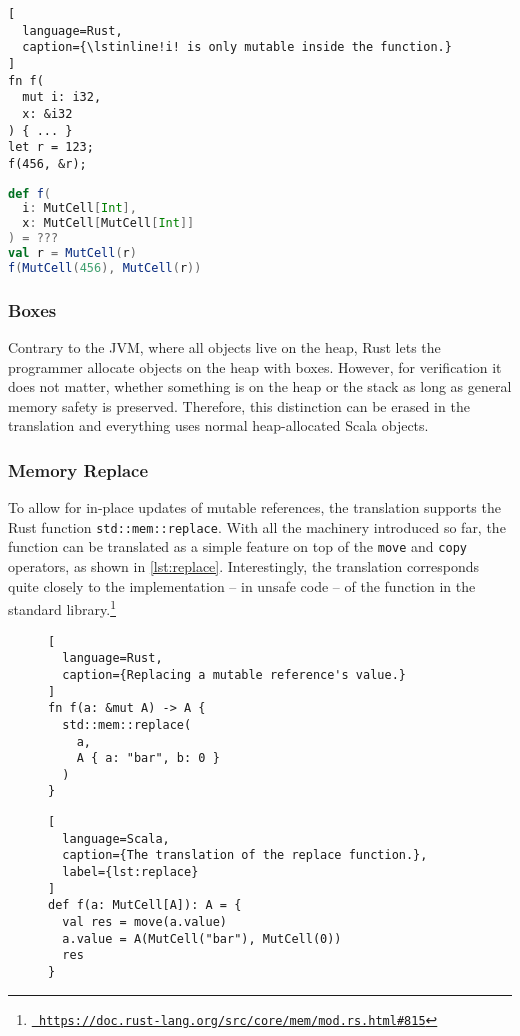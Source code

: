 \noindent\begin{minipage}[t]{.45\textwidth}
\begin{lstlisting}[
  language=Rust,
  caption={\lstinline!i! is only mutable inside the function.}
]
fn f(
  mut i: i32,
  x: &i32
) { ... }
let r = 123;
f(456, &r);
\end{lstlisting}
\end{minipage}\hfill
\begin{minipage}[t]{.45\textwidth}
\begin{lstlisting}[language=Scala]
def f(
  i: MutCell[Int],
  x: MutCell[MutCell[Int]]
) = ???
val r = MutCell(r)
f(MutCell(456), MutCell(r))
\end{lstlisting}
\end{minipage}

\subsubsection{Boxes}

Contrary to the JVM, where all objects live on the heap, Rust lets the
programmer allocate objects on the heap with boxes. However, for verification it
does not matter, whether something is on the heap or the stack as long as
general memory safety is preserved. Therefore, this distinction can be erased in
the translation and everything uses normal heap-allocated Scala objects.

\subsubsection{Memory Replace}

To allow for in-place updates of mutable references, the translation supports
the  Rust function \lstinline!std::mem::replace!. With all the machinery
introduced so far, the function can be translated as a simple feature on top of
the \lstinline!move! and \lstinline!copy! operators, as shown in
\autoref{lst:replace}. Interestingly, the translation corresponds quite closely
to the implementation -- in unsafe code -- of the function in the standard
library.\footnote{\href{}{\texttt{\color{MidnightBlue}
https://doc.rust-lang.org/src/core/mem/mod.rs.html\#815}}}

\begin{figure}
\noindent\begin{minipage}[t]{.4\textwidth}
\begin{lstlisting}[
  language=Rust,
  caption={Replacing a mutable reference's value.}
]
fn f(a: &mut A) -> A {
  std::mem::replace(
    a,
    A { a: "bar", b: 0 }
  )
}
\end{lstlisting}
\end{minipage}\hfill
\begin{minipage}[t]{.55\textwidth}
\begin{lstlisting}[
  language=Scala,
  caption={The translation of the replace function.},
  label={lst:replace}
]
def f(a: MutCell[A]): A = {
  val res = move(a.value)
  a.value = A(MutCell("bar"), MutCell(0))
  res
}
\end{lstlisting}
\end{minipage}
\end{figure}



